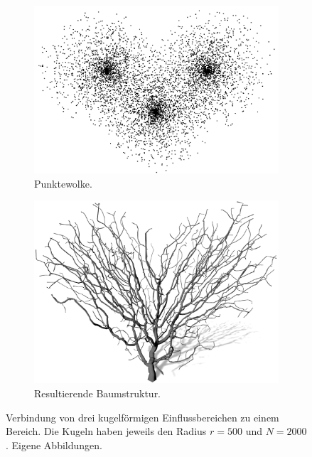  \begin{figure} [hbtp]
 	\centering
 	\begin{subfigure}[t]{.45\textwidth}
 		\centering
 		\includegraphics[height=.19\textheight]{images/SCA_MultipleSpheres_Points.png}
 		\caption{Punktewolke.}
 		\label{subfig:SCA_MultipleSpheres_Points}
 	\end{subfigure}
 	\hspace{.05\linewidth}
 	\begin{subfigure}[t]{.45\textwidth}
 		\centering
 		\includegraphics[height=.19\textheight]{images/SCA_MultipleSpheres_Grown.png}
 		\caption{Resultierende Baumstruktur.}
 		\label{subfig:SCA_MultipleSpheres_Grown}
 	\end{subfigure}	
 	\caption{Verbindung von drei kugelförmigen Einflussbereichen zu einem Bereich. Die Kugeln haben jeweils den Radius $r=500$ und $N=2000$. Eigene Abbildungen.}
 	\label{fig:SCA_MultipleSpheres}
 \end{figure}
 
